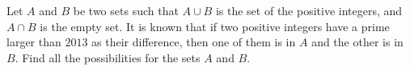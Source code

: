 Let $A$ and $B$ be two sets such that $A \cup B$ is the set of the positive integers, and $A \cap B$ is the empty set. It is known that if two positive integers have a prime larger than $2013$ as their difference, then one of them is in $A$ and the other is in $B$. Find all the possibilities for the sets $A$ and $B$.